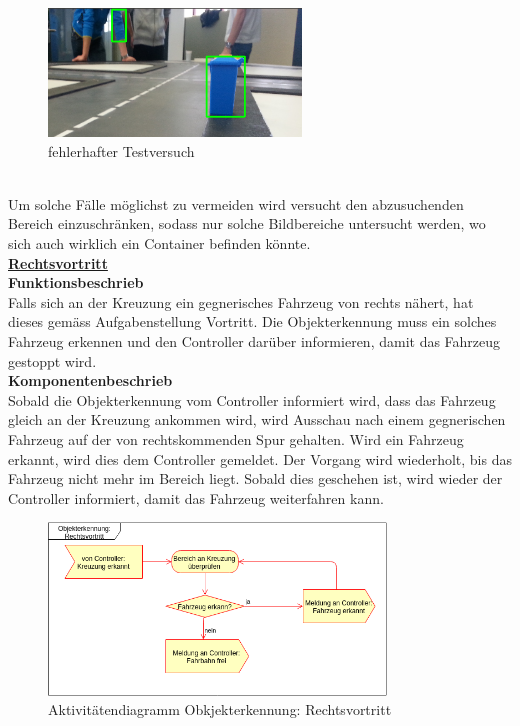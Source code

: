 \begin{figure}[H]%
\centering
\includegraphics[width=0.6\textwidth]{03_Loesungskonzept/pictures/objekterkennung_blau_fehl.png}
\caption{fehlerhafter Testversuch}
\label{fig:fehlerhafter Testversuch}
\end{figure} \\
\flushleft
Um solche Fälle möglichst zu vermeiden wird versucht den abzusuchenden Bereich  einzuschränken, sodass nur solche Bildbereiche untersucht werden, wo sich auch wirklich ein Container befinden könnte. 
\\[0.2cm]
\underline{\textbf{Rechtsvortritt}}
\\[0.2cm]
\textbf{Funktionsbeschrieb}\\[0.2cm]
Falls sich an der Kreuzung ein gegnerisches Fahrzeug von rechts nähert, hat dieses gemäss Aufgabenstellung Vortritt. Die Objekterkennung muss ein solches Fahrzeug erkennen und den Controller darüber informieren, damit das Fahrzeug gestoppt wird.
\\[0.2cm]
\textbf{Komponentenbeschrieb}\\[0.2cm]
Sobald die Objekterkennung vom Controller informiert wird, dass das Fahrzeug gleich an der Kreuzung ankommen wird, wird Ausschau nach einem gegnerischen Fahrzeug auf der von rechtskommenden Spur gehalten. Wird ein Fahrzeug erkannt, wird dies dem Controller gemeldet. Der Vorgang wird wiederholt, bis das Fahrzeug nicht mehr im Bereich liegt. Sobald dies geschehen ist, wird wieder der Controller informiert, damit das Fahrzeug weiterfahren kann.
\begin{figure}[H]%
\centering
\includegraphics[width=0.8\textwidth]{03_Loesungskonzept/pictures/objekterkennung_rechtsvortritt.png}
\caption{Aktivitätendiagramm Obkjekterkennung: Rechtsvortritt}
\label{fig:activityRechtsvortritt}
\end{figure} \\
